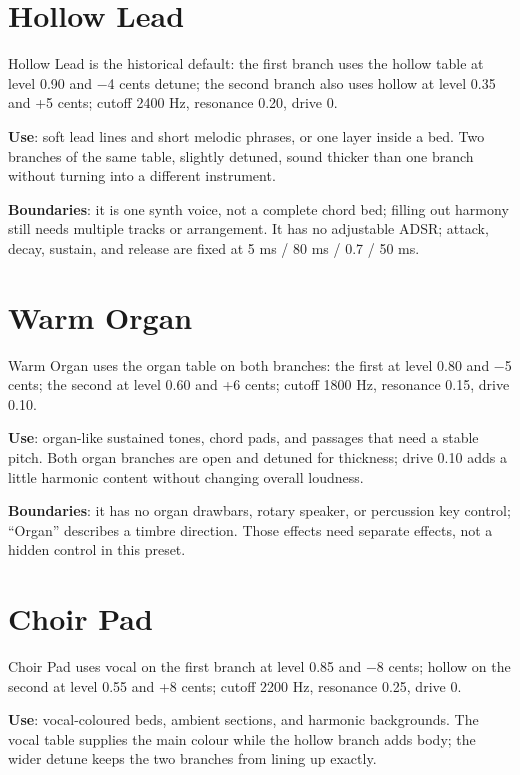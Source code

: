 \section{Hollow Lead}

Hollow Lead is the historical default: the first branch uses the hollow table at
level 0.90 and −4 cents detune; the second branch also uses hollow at level 0.35
and +5 cents; cutoff 2400 Hz, resonance 0.20, drive 0.

\textbf{Use}: soft lead lines and short melodic phrases, or one layer inside a bed.
Two branches of the same table, slightly detuned, sound thicker than one branch
without turning into a different instrument.

\textbf{Boundaries}: it is one synth voice, not a complete chord bed; filling out
harmony still needs multiple tracks or arrangement. It has no adjustable ADSR;
attack, decay, sustain, and release are fixed at 5 ms / 80 ms / 0.7 / 50 ms.

\section{Warm Organ}

Warm Organ uses the organ table on both branches: the first at level 0.80 and
−5 cents; the second at level 0.60 and +6 cents; cutoff 1800 Hz, resonance 0.15,
drive 0.10.

\textbf{Use}: organ-like sustained tones, chord pads, and passages that need a
stable pitch. Both organ branches are open and detuned for thickness; drive 0.10
adds a little harmonic content without changing overall loudness.

\textbf{Boundaries}: it has no organ drawbars, rotary speaker, or percussion key
control; ``Organ'' describes a timbre direction. Those effects need separate
effects, not a hidden control in this preset.

\section{Choir Pad}

Choir Pad uses vocal on the first branch at level 0.85 and −8 cents; hollow on the
second at level 0.55 and +8 cents; cutoff 2200 Hz, resonance 0.25, drive 0.

\textbf{Use}: vocal-coloured beds, ambient sections, and harmonic backgrounds.
The vocal table supplies the main colour while the hollow branch adds body;
the wider detune keeps the two branches from lining up exactly.

